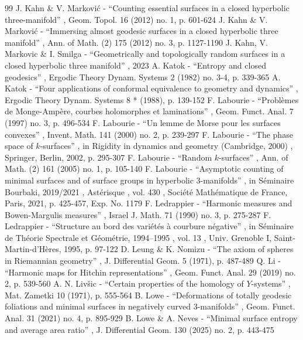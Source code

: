 \documentclass[10pt]{amsart}
\theoremstyle{plain}
\theoremstyle{definition}
\begin{document}
\begin{thebibliography}{99}
 J. Kahn \& V. Marković - “Counting essential surfaces in a closed hyperbolic three-manifold” , Geom. Topol. 16 (2012) no. 1, p. 601-624
 J. Kahn \& V. Marković - “Immersing almost geodesic surfaces in a closed hyperbolic three manifold” , Ann. of Math. (2) 175 (2012) no. 3, p. 1127-1190
 J. Kahn, V. Markovic \& I. Smilga - “Geometrically and topologically random surfaces in a closed hyperbolic three manifold” , 2023
 A. Katok - “Entropy and closed geodesics” , Ergodic Theory Dynam. Systems 2 (1982) no. 3-4, p. 339-365
 A. Katok - “Four applications of conformal equivalence to geometry and dynamics” , Ergodic Theory Dynam. Systems 8 * (1988), p. 139-152
 F. Labourie - “Problèmes de Monge-Ampère, courbes holomorphes et laminations” , Geom. Funct. Anal. 7 (1997) no. 3, p. 496-534
 F. Labourie - “Un lemme de Morse pour les surfaces convexes” , Invent. Math. 141 (2000) no. 2, p. 239-297
 F. Labourie - “The phase space of $k$-surfaces” , in Rigidity in dynamics and geometry (Cambridge, 2000) , Springer, Berlin, 2002, p. 295-307
 F. Labourie - “Random $k$-surfaces” , Ann. of Math. (2) 161 (2005) no. 1, p. 105-140
 F. Labourie - “Asymptotic counting of minimal surfaces and of surface groups in hyperbolic 3-manifolds” , in Séminaire Bourbaki, 2019/2021 , Astérisque , vol. 430 , Société Mathématique de France, Paris, 2021, p. 425-457, Exp. No. 1179
 F. Ledrappier - “Harmonic measures and Bowen-Margulis measures” , Israel J. Math. 71 (1990) no. 3, p. 275-287
 F. Ledrappier - “Structure au bord des variétés à courbure négative” , in Séminaire de Théorie Spectrale et Géométrie, 1994–1995 , vol. 13 , Univ. Grenoble I, Saint-Martin-d’Hères, 1995, p. 97-122
 D. Leung \& K. Nomizu - “The axiom of spheres in Riemannian geometry” , J. Differential Geom. 5 (1971), p. 487-489
 Q. Li - “Harmonic maps for Hitchin representations” , Geom. Funct. Anal. 29 (2019) no. 2, p. 539-560
 A. N. Livšic - “Certain properties of the homology of $Y$-systems” , Mat. Zametki 10 (1971), p. 555-564
 B. Lowe - “Deformations of totally geodesic foliations and minimal surfaces in negatively curved 3-manifolds” , Geom. Funct. Anal. 31 (2021) no. 4, p. 895-929
 B. Lowe \& A. Neves - “Minimal surface entropy and average area ratio” , J. Differential Geom. 130 (2025) no. 2, p. 443-475

\end{thebibliography}
\end{document}
